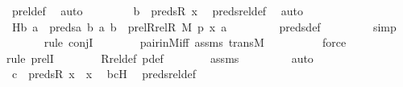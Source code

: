 \begin{isabellebody}
\ prel{\isacharunderscore}{\kern0pt}def\ \isamarkupfalse%
\ auto\ \isanewline
\isanewline
\ \ \ \ \isamarkupfalse%
\ \isamarkupfalse%
\ {\isachardoublequoteopen}b\ {\isasymin}\ preds{\isacharparenleft}{\kern0pt}R{\isacharcomma}{\kern0pt}\ x{\isacharparenright}{\kern0pt}{\isachardoublequoteclose}\ \isamarkupfalse%
\ preds{\isacharunderscore}{\kern0pt}rel{\isacharunderscore}{\kern0pt}def\ \isamarkupfalse%
\ auto\ \isanewline
\ \ \ \ \isamarkupfalse%
\ \isamarkupfalse%
\ H{}{\isacharcolon}{\kern0pt}{\isachardoublequoteopen}{\isasymlangle}b{\isacharcomma}{\kern0pt}\ a{\isasymrangle}\ {\isasymin}\ preds{\isacharparenleft}{\kern0pt}{\isasymlambda}a\ b{\isachardot}{\kern0pt}\ {\isasymlangle}a{\isacharcomma}{\kern0pt}\ b{\isasymrangle}\ {\isasymin}\ prel{\isacharparenleft}{\kern0pt}Rrel{\isacharparenleft}{\kern0pt}R{\isacharcomma}{\kern0pt}\ M{\isacharparenright}{\kern0pt}{\isacharcomma}{\kern0pt}\ p{\isacharparenright}{\kern0pt}{\isacharcomma}{\kern0pt}\ {\isasymlangle}x{\isacharcomma}{\kern0pt}\ a{\isasymrangle}{\isacharparenright}{\kern0pt}{\isachardoublequoteclose}\ \isanewline
\ \ \ \ \ \ \isamarkupfalse%
\ preds{\isacharunderscore}{\kern0pt}def\ \isanewline
\ \ \ \ \ \ \isamarkupfalse%
\ simp\isanewline
\ \ \ \ \ \ \isamarkupfalse%
{\isacharparenleft}{\kern0pt}rule\ conjI{\isacharparenright}{\kern0pt}\isanewline
\ \ \ \ \ \ \isamarkupfalse%
\ pair{\isacharunderscore}{\kern0pt}in{\isacharunderscore}{\kern0pt}M{\isacharunderscore}{\kern0pt}iff\ assms\ transM\ \isanewline
\ \ \ \ \ \ \ \isamarkupfalse%
\ force\isanewline
\ \ \ \ \ \ \isamarkupfalse%
{\isacharparenleft}{\kern0pt}rule\ prelI{\isacharparenright}{\kern0pt}\isanewline
\ \ \ \ \ \ \isamarkupfalse%
\ Rrel{\isacharunderscore}{\kern0pt}def\ p{\isacharunderscore}{\kern0pt}def\isanewline
\ \ \ \ \ \ \isamarkupfalse%
\ assms\ \isanewline
\ \ \ \ \ \ \isamarkupfalse%
\ auto\isanewline
\ \ \ \ \isamarkupfalse%
\ \isamarkupfalse%
\ {\isachardoublequoteopen}c\ {\isasymin}\ preds{\isacharparenleft}{\kern0pt}R{\isacharcomma}{\kern0pt}\ x{\isacharparenright}{\kern0pt}\ {\isasymunion}\ {\isacharbraceleft}{\kern0pt}x{\isacharbraceright}{\kern0pt}{\isachardoublequoteclose}\ \isamarkupfalse%
\ bcH\ \isamarkupfalse%
\ preds{\isacharunderscore}{\kern0pt}rel{\isacharunderscore}{\kern0pt}def\ \isamarkupfalse%

\end{isabellebody}
